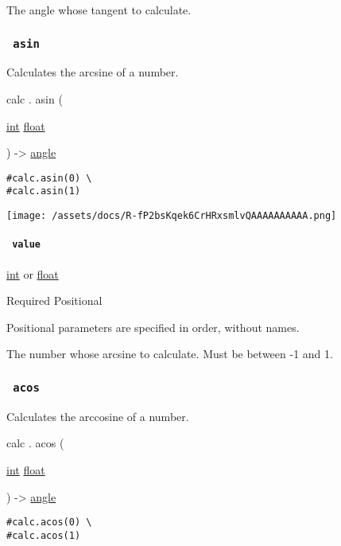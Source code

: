 The angle whose tangent to calculate.

\subsubsection{\texorpdfstring{\texttt{\ asin\ }}{ asin }}\label{functions-asin}

Calculates the arcsine of a number.

calc { . } { asin } (

{ \href{/docs/reference/foundations/int/}{int}
\href{/docs/reference/foundations/float/}{float} }

) -\textgreater{} \href{/docs/reference/layout/angle/}{angle}

\begin{verbatim}
#calc.asin(0) \
#calc.asin(1)
\end{verbatim}

\texttt{[image: /assets/docs/R-fP2bsKqek6CrHRxsmlvQAAAAAAAAAA.png]}

\paragraph{\texorpdfstring{\texttt{\ value\ }}{ value }}\label{functions-asin-value}

\href{/docs/reference/foundations/int/}{int} {or}
\href{/docs/reference/foundations/float/}{float}

{Required} {{ Positional }}

\label{functions-asin-value-positional-tooltip}
Positional parameters are specified in order, without names.

The number whose arcsine to calculate. Must be between -1 and 1.

\subsubsection{\texorpdfstring{\texttt{\ acos\ }}{ acos }}\label{functions-acos}

Calculates the arccosine of a number.

calc { . } { acos } (

{ \href{/docs/reference/foundations/int/}{int}
\href{/docs/reference/foundations/float/}{float} }

) -\textgreater{} \href{/docs/reference/layout/angle/}{angle}

\begin{verbatim}
#calc.acos(0) \
#calc.acos(1)
\end{verbatim}

